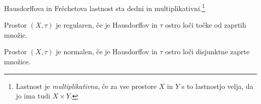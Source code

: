 \begin{trditev}
Hausdorffova in Fréchetova lastnost sta dedni in
multiplikativni.\footnote{Lastnost je \emph{multiplikativna}, če za
vse prostore $X$ in $Y$ s to lastnostjo velja, da jo ima tudi
$X \times Y$.}
\end{trditev}

\obvs

\begin{definicija}
Prostor $(X, \tau)$ je regularen, če je Hausdorffov in $\tau$ ostro
loči točke od zaprtih množic.
\end{definicija}

\begin{definicija}
Prostor $(X, \tau)$ je normalen, če je Hausdorffov in $\tau$ ostro
loči disjunktne zaprte množice.
\end{definicija}
